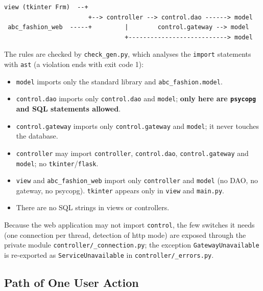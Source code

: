 \begin{lstlisting}[numbers=none]
 view (tkinter Frm)  --+
                       +--> controller --> control.dao ------> model
 abc_fashion_web  -----+         |        control.gateway --> model
                                 +---------------------------> model
\end{lstlisting}

The rules are checked by \texttt{check\_\allowbreak{}gen.\allowbreak{}py}, which analyses the
\texttt{import} statements with \texttt{ast} (a violation ends with exit
code 1):

\begin{itemize}
\tightlist
\item
  \texttt{model} imports only the standard library and
  \texttt{abc\_\allowbreak{}fashion.\allowbreak{}model}.
\item
  \texttt{control.\allowbreak{}dao} imports only \texttt{control.\allowbreak{}dao} and
  \texttt{model}; \textbf{only here are \texttt{psycopg} and SQL
  statements allowed}.
\item
  \texttt{control.\allowbreak{}gateway} imports only \texttt{control.\allowbreak{}gateway} and
  \texttt{model}; it never touches the database.
\item
  \texttt{controller} may import \texttt{controller},
  \texttt{control.\allowbreak{}dao}, \texttt{control.\allowbreak{}gateway} and \texttt{model}; no
  \texttt{tkinter}/\texttt{flask}.
\item
  \texttt{view} and \texttt{abc\_\allowbreak{}fashion\_\allowbreak{}web} import only
  \texttt{controller} and \texttt{model} (no DAO, no gateway, no
  psycopg). \texttt{tkinter} appears only in \texttt{view} and
  \texttt{main.\allowbreak{}py}.
\item
  There are no SQL strings in views or controllers.
\end{itemize}

Because the web application may not import \texttt{control}, the few
switches it needs (one connection per thread, detection of http mode)
are exposed through the private module
\texttt{controller/\allowbreak{}\_\allowbreak{}connection.\allowbreak{}py}; the exception
\texttt{GatewayUnavailable} is re-exported as
\texttt{ServiceUnavailable} in \texttt{controller/\allowbreak{}\_\allowbreak{}errors.\allowbreak{}py}.

\hypertarget{path-of-one-user-action}{%
\subsection{Path of One User Action}\label{path-of-one-user-action}}

